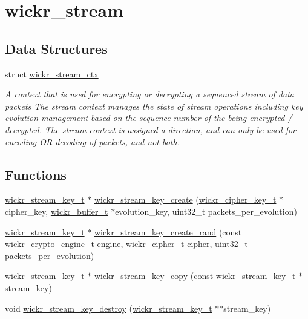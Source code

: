 \hypertarget{group__wickr__stream}{}\section{wickr\+\_\+stream}
\label{group__wickr__stream}
\subsection*{Data Structures}
\begin{DoxyCompactItemize}
\item 
struct \hyperlink{structwickr__stream__ctx}{wickr\+\_\+stream\+\_\+ctx}
\begin{DoxyCompactList}\small\item\em A context that is used for encrypting or decrypting a sequenced stream of data packets The stream context manages the state of stream operations including key evolution management based on the sequence number of the being encrypted / decrypted. The stream context is assigned a direction, and can only be used for encoding OR decoding of packets, and not both. \end{DoxyCompactList}\end{DoxyCompactItemize}
\subsection*{Functions}
\begin{DoxyCompactItemize}
\item 
\hyperlink{structwickr__stream__key}{wickr\+\_\+stream\+\_\+key\+\_\+t} $\ast$ \hyperlink{group__wickr__stream_ga54449667a25d9e64cd04dae58dd76418}{wickr\+\_\+stream\+\_\+key\+\_\+create} (\hyperlink{structwickr__cipher__key}{wickr\+\_\+cipher\+\_\+key\+\_\+t} $\ast$cipher\+\_\+key, \hyperlink{structwickr__buffer}{wickr\+\_\+buffer\+\_\+t} $\ast$evolution\+\_\+key, uint32\+\_\+t packets\+\_\+per\+\_\+evolution)
\item 
\hyperlink{structwickr__stream__key}{wickr\+\_\+stream\+\_\+key\+\_\+t} $\ast$ \hyperlink{group__wickr__stream_ga9e95dd486dbe2f3db647c65042601b34}{wickr\+\_\+stream\+\_\+key\+\_\+create\+\_\+rand} (const \hyperlink{structwickr__crypto__engine}{wickr\+\_\+crypto\+\_\+engine\+\_\+t} engine, \hyperlink{structwickr__cipher}{wickr\+\_\+cipher\+\_\+t} cipher, uint32\+\_\+t packets\+\_\+per\+\_\+evolution)
\item 
\hyperlink{structwickr__stream__key}{wickr\+\_\+stream\+\_\+key\+\_\+t} $\ast$ \hyperlink{group__wickr__stream_ga0201dd73adf773834d7dbb4bbc307fae}{wickr\+\_\+stream\+\_\+key\+\_\+copy} (const \hyperlink{structwickr__stream__key}{wickr\+\_\+stream\+\_\+key\+\_\+t} $\ast$stream\+\_\+key)
\item 
void \hyperlink{group__wickr__stream_ga3bb3dec760c5b7f3a1bd2d0bb13bcc79}{wickr\+\_\+stream\+\_\+key\+\_\+destroy} (\hyperlink{structwickr__stream__key}{wickr\+\_\+stream\+\_\+key\+\_\+t} $\ast$$\ast$stream\+\_\+key)
\end{DoxyCompactItemize}


